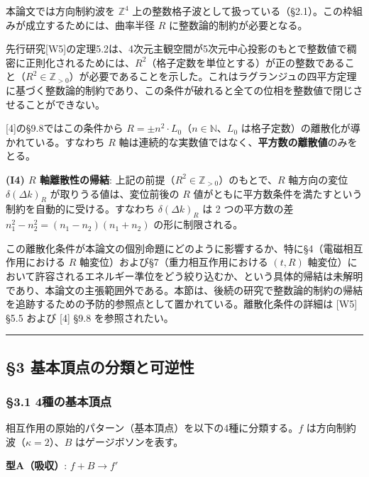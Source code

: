 \documentclass[
  a4paper,11pt]{ltjsarticle}
\theoremstyle{definition}
\theoremstyle{remark}
\begin{document}
本論文では方向制約波を \(\mathbb{Z}^4\)
上の整数格子波として扱っている（§2.1）。この枠組みが成立するためには、曲率半径
\(R\) に整数論的制約が必要となる。

先行研究{[}W5{]}の定理5.2は、4次元主観空間が5次元中心投影のもとで整数値で稠密に正則化されるためには、\(R^2\)（格子定数を単位とする）が正の整数であること（\(R^2 \in \mathbb{Z}_{>0}\)）が必要であることを示した。これはラグランジュの四平方定理に基づく整数論的制約であり、この条件が破れると全ての位相を整数値で閉じさせることができない。

{[}4{]}の§9.8ではこの条件から
\(R = \pm n^2 \cdot L_0\)（\(n \in \mathbb{N}\)、\(L_0\)
は格子定数）の離散化が導かれている。すなわち \(R\)
軸は連続的な実数値ではなく、\textbf{平方数の離散値}のみをとる。

\textbf{(I4) \(R\) 軸離散性の帰結}:
上記の前提（\(R^2 \in \mathbb{Z}_{>0}\)）のもとで、\(R\) 軸方向の変位
\(\delta(\Delta k)_R\) が取りうる値は、変位前後の \(R\)
値がともに平方数条件を満たすという制約を自動的に受ける。すなわち
\(\delta(\Delta k)_R\) は 2 つの平方数の差
\(n_1^2 - n_2^2 = (n_1 - n_2)(n_1 + n_2)\) の形に制限される。

この離散化条件が本論文の個別命題にどのように影響するか、特に§4（電磁相互作用における
\(R\) 軸変位）および§7（重力相互作用における \((t, R)\)
軸変位）において許容されるエネルギー準位をどう絞り込むか、という具体的帰結は未解明であり、本論文の主張範囲外である。本節は、後続の研究で整数論的制約の帰結を追跡するための予防的参照点として置かれている。離散化条件の詳細は
{[}W5{]} §5.5 および {[}4{]} §9.8 を参照されたい。

\begin{center}\rule{0.5\linewidth}{0.5pt}\end{center}

\subsection{§3
基本頂点の分類と可逆性}\label{ux57faux672cux9802ux70b9ux306eux5206ux985eux3068ux53efux9006ux6027}

\subsubsection{§3.1
4種の基本頂点}\label{ux7a2eux306eux57faux672cux9802ux70b9}

相互作用の原始的パターン（基本頂点）を以下の4種に分類する。\(f\)
は方向制約波（\(\kappa = 2\)）、\(B\) はゲージボソンを表す。

\textbf{型A（吸収）}: \(f + B \longrightarrow f'\)
\end{document}
